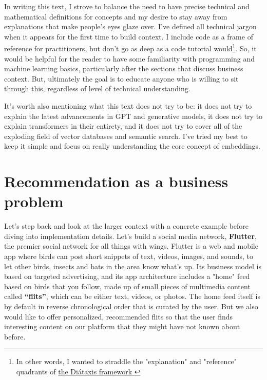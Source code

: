 \documentclass[11pt, table]{diazessay} %
\begin{document}
\begin{sloppypar}
In writing this text, I strove to balance the need to have precise technical and mathematical definitions for concepts and my desire to stay away from explanations that make people's eyes glaze over.  I've defined all technical jargon when it appears for the first time to build context. I include code as a frame of reference for practitioners, but don't go as deep as a code tutorial would\footnote{In other words, I wanted to straddle the "explanation" and "reference" quadrants of \href{https://diataxis.fr/}{the Diátaxis framework }}. So, it would be helpful for the reader to have some familiarity with programming and machine learning basics, particularly after the sections that discuss business context. But, ultimately the goal is to educate anyone who is willing to sit through this, regardless of level of technical understanding.

It's worth also mentioning what this text does not try to be: it does not try to explain the latest advancements in GPT and generative models, it does not try to explain transformers in their entirety, and it does not try to cover all of the exploding field of vector databases and semantic search. I've tried my best to keep it simple and focus on really understanding the core concept of embeddings.

\section{Recommendation as a business problem}

Let's step back and look at the larger context with a concrete example before diving into implementation details.  Let's build a social media network, \textbf{Flutter}, the premier social network for all things with wings. Flutter is a web and mobile app where birds can post short snippets of text, videos, images, and sounds, to let other birds, insects and bats in the area know what’s up. Its business model is based on targeted advertising, and its app architecture includes a "home" feed based on birds that you follow, made up of small pieces of multimedia content called \textbf{“flits”}, which can be either text, videos, or photos. The home feed itself is by default in reverse chronological order that is curated by the user. But we also would like to offer personalized, recommended flits so that the user finds interesting content on our platform that they might have not known about before.  


\end{sloppypar}
\end{document}
